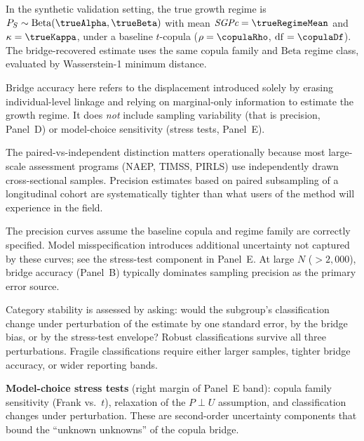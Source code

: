 \documentclass[10pt]{article}
\newlength{\fnlabelwidth}
\newcommand{\fnline}[2]{%
  \par\noindent
  \makebox[\fnlabelwidth][l]{$^{#1}$}%
  \parbox[t]{\dimexpr\linewidth-\fnlabelwidth\relax}{#2}%
  \par
}
\begin{document}
\noindent
\hspace{0.5in}%
\begin{minipage}[t]{19.2in}
\small\raggedright
\setlength{\parskip}{0pt}

\fnline{1}{In the synthetic validation setting, the true growth regime is
$P_S \sim \mathrm{Beta}(\trueAlpha, \trueBeta)$ with mean $\SGPc = \trueRegimeMean$
and $\kappa = \trueKappa$, under a baseline $t$-copula
($\rho = \copulaRho$, $\mathrm{df} = \copulaDf$).
The bridge-recovered estimate uses the same copula family and
$\mathrm{Beta}$ regime class, evaluated by Wasserstein-1 minimum distance.}

\vspace{4pt}
\fnline{2}{Bridge accuracy here refers to the displacement introduced solely
by erasing individual-level linkage and relying on marginal-only information
to estimate the growth regime. It does \emph{not} include sampling variability
(that is precision, Panel~D) or model-choice sensitivity (stress tests, Panel~E).}

\vspace{4pt}
\fnline{3}{The paired-vs-independent distinction matters operationally because
most large-scale assessment programs (NAEP, TIMSS, PIRLS) use independently
drawn cross-sectional samples. Precision estimates based on paired subsampling
of a longitudinal cohort are systematically tighter than what users of the
method will experience in the field.}

\vspace{4pt}
\fnline{4}{The precision curves assume the baseline copula and regime family
are correctly specified. Model misspecification introduces additional uncertainty
not captured by these curves; see the stress-test component in Panel~E.
At large $N$ ($> 2{,}000$), bridge accuracy (Panel~B) typically dominates
sampling precision as the primary error source.}

\vspace{4pt}
\fnline{5}{Category stability is assessed by asking: would the subgroup's
classification change under perturbation of the estimate by one standard error,
by the bridge bias, or by the stress-test envelope? Robust classifications
survive all three perturbations. Fragile classifications require either larger
samples, tighter bridge accuracy, or wider reporting bands.}

\vspace{6pt}
\fnline{6}{\textbf{Model-choice stress tests} (right margin of Panel~E band):
copula family sensitivity (Frank vs.\ $t$), relaxation of the $P \perp U$
assumption, and classification changes under perturbation. These are
second-order uncertainty components that bound the ``unknown unknowns''
of the copula bridge.}

\end{minipage}
\end{document}
